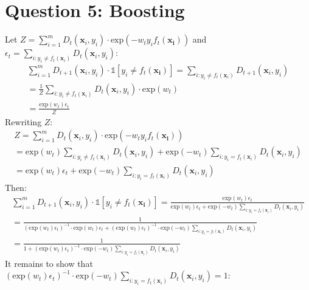 \documentclass[11pt, oneside]{article}   	%
\begin{document}
\section{Question 5: Boosting}
Let $Z = \sum_{i = 1}^{m} D_t(\boldsymbol{x}_i, y_i) \cdot \text{exp}(-w_t y_i f_t(\boldsymbol{x_i}))$ and $\epsilon_t = \sum_{i : y_i \neq f_t(\boldsymbol{x}_i)}D_t(\boldsymbol{x}_i, y_i)$:
\begin{gather*}
\sum_{i = 1}^{m}D_{t + 1}(\boldsymbol{x}_i, y_i) \cdot \mathds{1}[y_i \neq f_t(\boldsymbol{x_i})] = \sum_{i : y_i \neq f_t(\boldsymbol{x}_i)}D_{t + 1}(\boldsymbol{x}_i, y_i) \\
= \frac{1}{Z} \sum_{i : y_i \neq f_t(\boldsymbol{x}_i)}D_{t}(\boldsymbol{x}_i, y_i) \cdot \text{exp}(w_t)\\
= \frac{\text{exp}(w_t) \epsilon_t}{Z}
\end{gather*}
Rewriting $Z$:
\begin{gather*}
Z = \sum_{i = 1}^{m} D_t(\boldsymbol{x}_i, y_i) \cdot \text{exp}(-w_t y_i f_t(\boldsymbol{x_i}))\\
= \text{exp}(w_t) \sum_{i : y_i \neq f_t(\boldsymbol{x}_i)}D_t(\boldsymbol{x}_i, y_i) + \text{exp}(-w_t) \sum_{i : y_i = f_t(\boldsymbol{x}_i)}D_t(\boldsymbol{x}_i, y_i)\\
= \text{exp}(w_t) \epsilon_t + \text{exp}(-w_t) \sum_{i : y_i = f_t(\boldsymbol{x}_i)}D_t(\boldsymbol{x}_i, y_i)
\end{gather*}
Then:
\begin{gather*}
\sum_{i = 1}^{m}D_{t + 1}(\boldsymbol{x}_i, y_i) \cdot \mathds{1}[y_i \neq f_t(\boldsymbol{x_i})] = \frac{\text{exp}(w_t) \epsilon_t}{\text{exp}(w_t) \epsilon_t + \text{exp}(-w_t) \sum_{i : y_i = f_t(\boldsymbol{x}_i)}D_t(\boldsymbol{x}_i, y_i)}\\
= \frac{1}{(\text{exp}(w_t) \epsilon_t)^{-1} \cdot \text{exp}(w_t) \epsilon_t + (\text{exp}(w_t) \epsilon_t)^{-1} \cdot \text{exp}(-w_t) \sum_{i : y_i = f_t(\boldsymbol{x}_i)}D_t(\boldsymbol{x}_i, y_i)}\\
= \frac{1}{1 + (\text{exp}(w_t) \epsilon_t)^{-1} \cdot \text{exp}(-w_t) \sum_{i : y_i = f_t(\boldsymbol{x}_i)}D_t(\boldsymbol{x}_i, y_i)}
\end{gather*}
It remains to show that $(\text{exp}(w_t) \epsilon_t)^{-1} \cdot \text{exp}(-w_t) \sum_{i : y_i = f_t(\boldsymbol{x}_i)}D_t(\boldsymbol{x}_i, y_i) = 1$:
\end{document}
